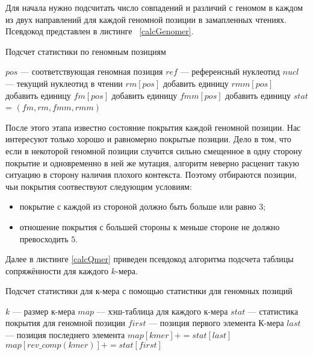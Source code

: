Для начала нужно подсчитать число совпадений и различий с геномом в каждом из двух направлений для каждой геномной позиции в замапленных чтениях. Псевдокод представлен в листинге ~\ref{calcGenomer}.

           \begin{algorithm}[h!]
	\caption{Подсчет статистики по геномным позициям}
	\label{calcGenomer}
	\begin{algorithmic}[1]
			\STATE $pos$ --- {соответствующая геномная позиция}
			\STATE $ref$ ---{ референсный нуклеотид}
 			\STATE $nucl$ --- {текущий нуклеотид в чтении}
					\STATE $rm[pos]$ {добавить единицу}
				\ELSE
					\STATE $rmm[pos]$ {добавить единицу}
			           \ENDIF
                                \ELSE 
                                		\STATE $fm[pos]$ {добавить единицу}
				\ELSE
					\STATE $fmm[pos]$ {добавить единицу}
				\ENDIF
			\ENDIF
		\ENDFOR
	\ENDFOR
           \STATE $stat$ = $(fm, rm, fmm, rmm)$ 
	\end{algorithmic}
	\end{algorithm}

После этого этапа известно состояние покрытия каждой геномной позиции. Нас интересуют только хорошо и равномерно покрытые позиции. Дело в том, что если в некоторой геномной позиции случится сильно смещенное в одну сторону покрытие и одновременно в ней же мутация, алгоритм неверно расценит такую ситуацию в сторону наличия плохого контекста. Поэтому отбираются позиции, чьи покрытия соотвествуют следующим условиям:
	\begin{itemize}
		\item покрытие с каждой из стороной должно быть больше или равно $3$;
		\item отношение покрытия с большей стороны к меньше стороне не должно превосходить $5$.
	\end{itemize}

Далее  в листинге \ref{calcQmer} приведен псевдокод алгоритма подсчета таблицы сопряжённости для каждого $k$-мера.

 \begin{algorithm}[h!]
	\caption{Подсчет статистики для к-мера с помощью статистики для геномных позиций}
	\label{calcQmer}
	\begin{algorithmic}[1]
	\REQUIRE
		$k$ --- размер к-мера
		$map$ --- хэш-таблица для каждого к-мера
		$stat$ --- статистика покрытия для геномной позиции
			\STATE $first$ --- {позиция первого элемента К-мера}
			\STATE $last$ --- {позиция последнего элемента}
			 $map[kmer] += stat[last]$
			 $map[rev\_comp(kmer)] += stat[first]$
		\ENDFOR
	\ENDFOR 
	\end{algorithmic}
	\end{algorithm}

